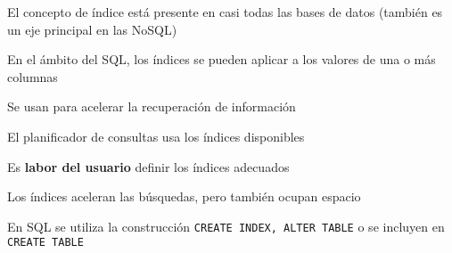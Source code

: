 El concepto de índice está presente en casi todas las bases de datos (también es un eje principal en las NoSQL)

En el ámbito del SQL, los índices se pueden aplicar a los valores de una o más columnas

Se usan para acelerar la recuperación de información

El planificador de consultas usa los índices disponibles

Es \textbf{labor del usuario} definir los índices adecuados

Los índices aceleran las búsquedas, pero también ocupan espacio

En SQL se utiliza la construcción \texttt{CREATE INDEX, ALTER TABLE} o se incluyen en \texttt{CREATE TABLE}